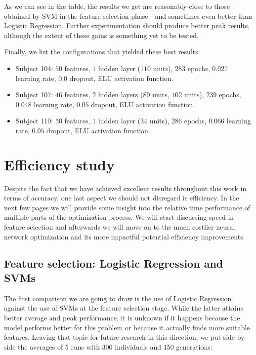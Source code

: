     As we can see in the table, the results we get are reasonably close to those obtained by \acs{SVM} in the feature selection phase---and sometimes even better than Logistic Regression. Further experimentation should produce better peak results, although the extent of these gains is something yet to be tested.

    Finally, we list the configurations that yielded these best results:

    \begin{itemize}

    	\item
    	Subject 104: $50$ features, $1$ hidden layer ($110$ units), $283$ epochs, $0.027$ learning rate, $0.0$ dropout, ELU activation function.

    	\item
    	Subject 107: $46$ features, $2$ hidden layers ($89$ units, $102$ units), $239$ epochs, $0.048$ learning rate, $0.05$ dropout, ELU activation function.

    	\item
    	Subject 110: $50$ features, $1$ hidden layer ($34$ units), $286$ epochs, $0.066$ learning rate, $0.05$ dropout, ELU activation function.

    \end{itemize}

\newpage

\section{Efficiency study}

	Despite the fact that we have achieved excellent results throughout this work in terms of accuracy, one last aspect we should not disregard is efficiency. In the next few pages we will provide some insight into the relative time performance of multiple parts of the optimization process. We will start discussing speed in feature selection and afterwards we will move on to the much costlier neural network optimization and its more impactful potential efficiency improvements.

	\subsection{Feature selection: Logistic Regression and SVMs}

		The first comparison we are going to draw is the use of Logistic Regression against the use of \acs{SVM}s at the feature selection stage. While the latter attains better average and peak performance, it is unknown if it happens because the model performs better for this problem or because it actually finds more suitable features. Leaving that topic for future research in this direction, we put side by side the averages of 5 runs with 300 individuals and 150 generations:

